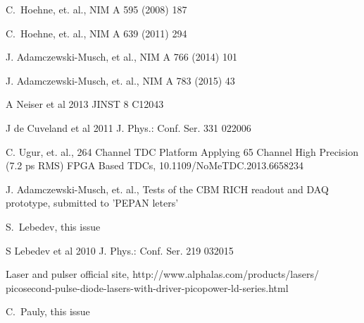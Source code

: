 \documentclass[final,5p,times,twocolumn]{elsarticle}
\begin{document}
\begin{thebibliography}{99}

C.~Hoehne, et. al.,
NIM A 595 (2008) 187

C.~Hoehne, et. al.,
NIM A 639 (2011) 294

J. Adamczewski-Musch, et al.,
NIM A 766 (2014) 101

J. Adamczewski-Musch, et. al.,
NIM A 783 (2015) 43

A Neiser et al 2013 JINST 8 C12043

J de Cuveland et al 2011 J. Phys.: Conf. Ser. 331 022006

C. Ugur, et. al.,
264 Channel TDC Platform Applying 65 Channel High Precision (7.2 ps RMS) FPGA Based TDCs,
10.1109/NoMeTDC.2013.6658234

J. Adamczewski-Musch, et. al.,
Tests of the CBM RICH readout and DAQ prototype,
submitted to 'PEPAN leters'

S.~Lebedev,
this issue

S Lebedev et al 2010 J. Phys.: Conf. Ser. 219 032015 

Laser and pulser official site,
http://www.alphalas.com/products/lasers/ picosecond-pulse-diode-lasers-with-driver-picopower-ld-series.html

C.~Pauly,
this issue

\end{thebibliography}

\end{document}
